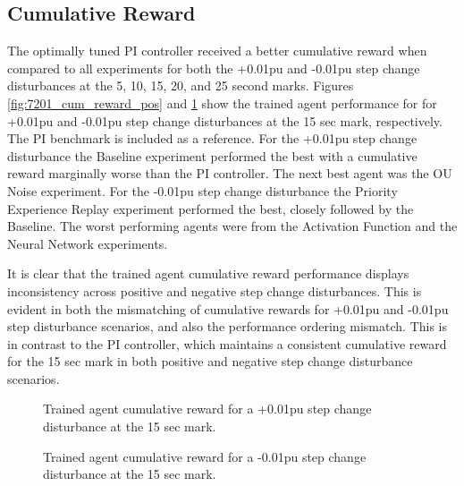 \subsection{Cumulative Reward}
The optimally tuned PI controller received a better cumulative reward when compared to all experiments for both the +0.01pu and -0.01pu step change disturbances at the 5, 10, 15, 20, and 25 second marks. Figures \ref{fig:7201_cum_reward_pos} and \ref{fig:7202_cum_reward_neg} show the trained agent performance for for +0.01pu and -0.01pu step change disturbances at the 15 sec mark, respectively. The PI benchmark is included as a reference. For the +0.01pu step change disturbance the Baseline experiment performed the best with a cumulative reward marginally worse than the PI controller. The next best agent was the OU Noise experiment. For the -0.01pu step change disturbance the Priority Experience Replay experiment performed the best, closely followed by the Baseline. The worst performing agents were from the Activation Function and the Neural Network experiments.

It is clear that the trained agent cumulative reward performance displays inconsistency across positive and negative step change disturbances. This is evident in both the mismatching of cumulative rewards for +0.01pu and -0.01pu step disturbance scenarios, and also the performance ordering mismatch. This is in contrast to the PI controller, which maintains a consistent cumulative reward for the 15 sec mark in both positive and negative step change disturbance scenarios.
\begin{figure}[h]
	\begin{minipage}[t]{0.50\textwidth}
		\centering
		\resizebox{7cm}{!}{}
		\caption{Trained agent cumulative reward for a +0.01pu step change disturbance at the 15 sec mark.}\label{fig:7201_cum_reward_pos}
	\end{minipage}
	\hspace{0.25cm}
	\begin{minipage}[t]{0.50\textwidth}
		\resizebox{7cm}{!}{}
		\caption{Trained agent cumulative reward for a -0.01pu step change disturbance at the 15 sec mark.}\label{fig:7202_cum_reward_neg}
	\end{minipage}
\end{figure}

